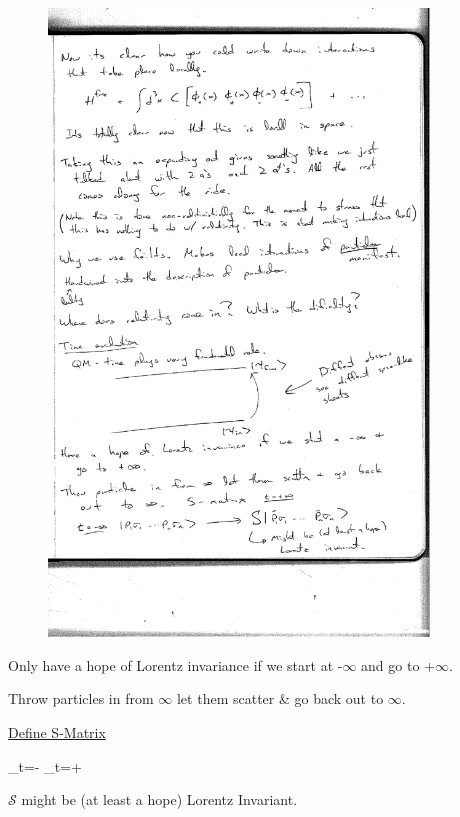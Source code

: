 {\begin{figure}[h]
\centering
\includegraphics[width=0.9\textwidth]{./TimeEvolution.pdf}
\end{figure}

Only have a hope of Lorentz invariance if we start at -$\infty$ and go to +$\infty$.

Throw particles in from $\infty$ let them scatter \& go back out to $\infty$.

\underline{Define S-Matrix}

\be
{}_{t=-\infty} \rightarrow {}_{t=+\infty}
\ee

$\mathcal{S}$ might be (at least a hope) Lorentz Invariant.

}



